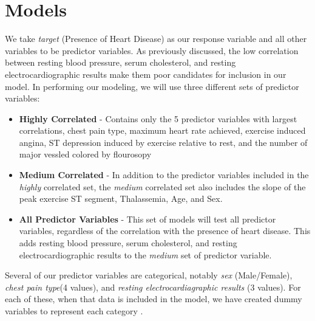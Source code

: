 \documentclass[letter]{article}
\begin{document}
\section{Models}
We take \textit{target} (Presence of Heart Disease) as our response variable and all other variables to be predictor variables.  As previously discussed, the low correlation between resting blood pressure, serum cholesterol, and resting electrocardiographic results make them poor candidates for inclusion in our model.  In performing our modeling, we will use three different sets of predictor variables:
\begin{itemize}
	\item \textbf{Highly Correlated} - Contains only the 5 predictor variables with largest correlations, chest pain type, maximum heart rate achieved, exercise induced angina, ST depression induced by exercise relative to rest, and the number of major vessled colored by flourosopy
	\item \textbf{Medium Correlated} - In addition to the predictor variables included in the \textit{highly} correlated set, the \textit{medium} correlated set also includes the slope of the peak exercise ST segment, Thalassemia, Age, and Sex.
	\item \textbf{All Predictor Variables} - This set of models will test all predictor variables, regardless of the correlation with the presence of heart disease.  This adds resting blood pressure, serum cholesterol, and resting electrocardiographic results to the \textit{medium} set of predictor variable.
\end{itemize}

Several of our predictor variables are categorical, notably \textit{sex} (Male/Female), \textit{chest pain type}(4 values), and \textit{resting electrocardiagraphic results} (3 values).  For each of these, when that data is included in the model, we have created dummy variables to represent each category  \citep{elem_stat_learn_unsup}.

\end{document}
